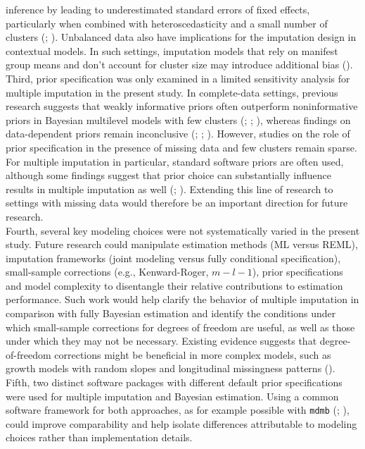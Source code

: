 \documentclass[
  letterpaper,
  11pt,
  english,
  singlespacing,
  headsepline,
  openany]{MastersDoctoralThesis}
\begin{document}
inference by leading to underestimated standard errors of fixed effects,
particularly when combined with heteroscedasticity and a small number of
clusters (;
). Unbalanced
data also have implications for the imputation design in contextual
models. In such settings, imputation models that rely on manifest group
means and don't account for cluster size may introduce additional bias
().\\
Third, prior specification was only examined in a limited sensitivity
analysis for multiple imputation in the present study. In complete-data
settings, previous research suggests that weakly informative priors
often outperform noninformative priors in Bayesian multilevel models
with few clusters (;
; ), whereas findings on data-dependent priors remain
inconclusive (;
; ). However, studies on the role of prior specification in
the presence of missing data and few clusters remain sparse. For
multiple imputation in particular, standard software priors are often
used, although some findings suggest that prior choice can substantially
influence results in multiple imputation as well
(;
). Extending this line of
research to settings with missing data would therefore be an important
direction for future research.\\
Fourth, several key modeling choices were not systematically varied in
the present study. Future research could manipulate estimation methods
(ML versus REML), imputation frameworks (joint modeling versus fully
conditional specification), small-sample corrections (e.g.,
Kenward-Roger, \(m−l−1\)), prior specifications and model complexity to
disentangle their relative contributions to estimation performance. Such
work would help clarify the behavior of multiple imputation in
comparison with fully Bayesian estimation and identify the conditions
under which small-sample corrections for degrees of freedom are useful,
as well as those under which they may not be necessary. Existing
evidence suggests that degree-of-freedom corrections might be beneficial
in more complex models, such as growth models with random slopes and
longitudinal missingness patterns ().\\
Fifth, two distinct software packages with different default prior
specifications were used for multiple imputation and Bayesian
estimation. Using a common software framework for both approaches, as
for example possible with \texttt{mdmb}
(;
), could improve
comparability and help isolate differences attributable to modeling
choices rather than implementation details.
\end{document}
